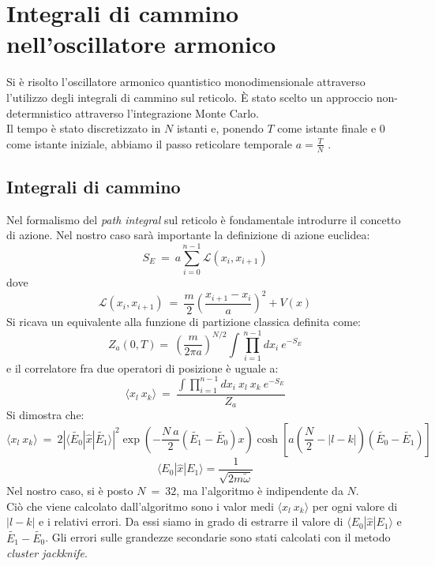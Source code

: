 \chapter{Integrali di cammino nell'oscillatore armonico}
Si è risolto l'oscillatore armonico quantistico monodimensionale attraverso l'utilizzo degli integrali di cammino sul reticolo.
È stato scelto un approccio non-determnistico attraverso l'integrazione Monte Carlo.\\
Il tempo è stato discretizzato in $N$ istanti e, ponendo $T$ come istante finale e $0$ come istante iniziale,
abbiamo il passo reticolare temporale $ a = \frac{T}{N}$ .
\section*{Integrali di cammino}
Nel formalismo del \emph{path integral} sul reticolo è fondamentale introdurre il concetto di azione.
Nel nostro caso sarà importante la definizione di azione euclidea:
$$
 S_E  \ = \ a \sum_{i=0}^{n-1} \mathcal{L}(x_i,x_{i+1})
$$
dove
$$
\mathcal{L}(x_i,x_{i+1}) \ = \ \frac{m}{2} \left( \frac{x_{i+1} -x_{i}}{a} \right)^2 + V(x)  
$$
 Si ricava un equivalente alla funzione di partizione classica definita come: 
$$
 Z_a (0,T) =  \ \left( \frac{m}{2 \pi a}\right)^{N/2} \int \prod_{i=1}^{n-1} dx_i \ e^{-S_E}
$$
e il correlatore fra due operatori di posizione è uguale a:
$$
 \langle x_l \ x_k \rangle  \ = \  \frac{ \int \prod_{i=1}^{n-1} dx_i \ x_l \ x_k \ e^{-S_E}}{Z_a}
$$
Si dimostra che:
$$
 \langle x_l \ x_k \rangle \ = \ 2 | \langle \tilde{E_0} | \hat{x} | \tilde{E_1} \rangle  |^2 \exp{\left( - \frac{N\ a}{2} \left( \tilde{E_1}-\tilde{E_0} \right) x \right)} \cosh \left[ a \left( \frac{N}{2} - | l - k | \right) (\tilde{E_0} -\tilde{E_1}) \right]  
$$
$$ 
\langle E_0 | \hat{x} | E_1 \rangle  = \frac{1}{\sqrt{2  m \tilde{\omega}}}
$$
Nel nostro caso, si è posto $ N \ = \ 32 $, ma l'algoritmo è indipendente da $N$.\\
Ciò che viene calcolato dall'algoritmo sono i valor medi $\langle x_l \ x_k \rangle $ per ogni valore di $ | l - k| $ e i relativi errori.
Da essi siamo in grado di estrarre il valore di $ \langle E_0 | \hat{x} | E_1 \rangle $ e $ \tilde{E_1}-\tilde{E_0} $.
Gli errori sulle grandezze secondarie sono stati calcolati con il metodo \emph{cluster jackknife}.
